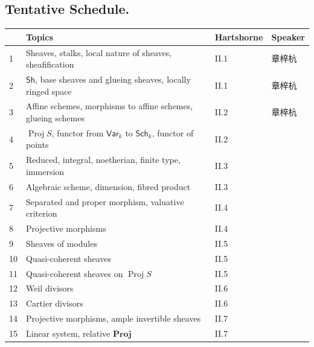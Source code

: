 \documentclass[11pt,a4paper]{ctexart}
\begin{document}
\subsection*{Tentative Schedule.}

\begin{table}[h]
\centering
\begin{tabular}{l l l l} %
\toprule[1pt] %
  & Topics & Hartshorne & Speaker \\
\midrule %
1 & Sheaves, stalks, local nature of sheaves, sheafification & II.1 & 章梓杭 \\
2 & $ \mathsf{Sh} $, base sheaves and glueing sheaves, locally ringed space  & II.1 & 章梓杭 \\
3 & Affine schemes, morphisms to affine schemes, glueing schemes & II.2 & 章梓杭 \\
4 & $\operatorname{Proj} S$, functor from $ \mathsf{Var}_{k} $ to $ \mathsf{Sch}_{k} $, functor of points & II.2 &  \\
5 & Reduced, integral, noetherian, finite type, immersion & II.3 &  \\
6 & Algebraic scheme, dimension, fibred product & II.3 &  \\
7 & Separated and proper morphism, valuative criterion & II.4 &  \\
8 & Projective morphisms & II.4 &  \\
9 & Sheaves of modules & II.5 &  \\
10 & Quasi-coherent sheaves & II.5 &  \\
11 & Quasi-coherent sheaves on $ \operatorname{Proj}S $ & II.5 &  \\
12 & Weil divisors & II.6 &  \\
13 & Cartier divisors & II.6 & \\
14 & Projective morphisms, ample invertible sheaves & II.7 &  \\
15 & Linear system, relative $ \mathbf{Proj} $  & II.7 &  \\
 
\bottomrule[1pt] %
\end{tabular}
\end{table}
\end{document}
